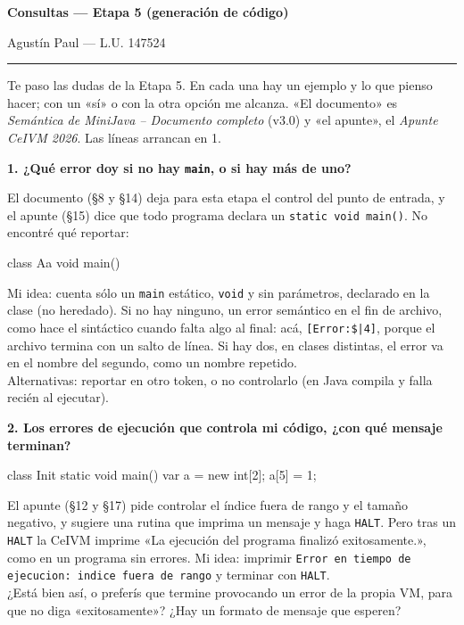 \documentclass[12pt,a4paper]{article}
\newcommand{\cod}[1]{\texttt{#1}}
\newcommand{\pregunta}[1]{\par\medskip\needspace{4\baselineskip}\noindent\textbf{#1}\par\smallskip}
\begin{document}
\thispagestyle{fancy}
\raggedright

{\LARGE\bfseries Consultas --- Etapa 5 (generación de código)\par}
\smallskip
{\color{tinta}Agustín Paul --- L.U. 147524\par}
\smallskip
{\color{tinta}\rule{\textwidth}{0.6pt}}
\medskip

Te paso las dudas de la Etapa 5. En cada una hay un ejemplo y lo que pienso hacer; con un «sí» o
con la otra opción me alcanza. «El documento» es \emph{Semántica de MiniJava -- Documento
completo} (v3.0) y «el apunte», el \emph{Apunte CeIVM 2026}. Las líneas arrancan en 1.

\pregunta{1. ¿Qué error doy si no hay \cod{main}, o si hay más de uno?}

El documento (§8 y §14) deja para esta etapa el control del punto de entrada, y el apunte (§15)
dice que todo programa declara un \cod{static void main()}. No encontré qué reportar:

\begin{fuente}
class Aa {
    void main() { }
}
\end{fuente}

Mi idea: cuenta sólo un \cod{main} estático, \cod{void} y sin parámetros, declarado en la clase (no
heredado). Si no hay ninguno, un error semántico en el fin de archivo, como hace el sintáctico
cuando falta algo al final: acá, \cod{[Error:\$|4]}, porque el archivo termina con un salto de
línea. Si hay dos, en clases distintas, el error va
en el nombre del segundo, como un nombre repetido.\\
Alternativas: reportar en otro token, o no controlarlo (en Java compila y falla recién al ejecutar).

\pregunta{2. Los errores de ejecución que controla mi código, ¿con qué mensaje terminan?}

\begin{fuente}
class Init {
    static void main() {
        var a = new int[2];
        a[5] = 1;
    }
}
\end{fuente}

El apunte (§12 y §17) pide controlar el índice fuera de rango y el tamaño negativo, y sugiere una
rutina que imprima un mensaje y haga \cod{HALT}. Pero tras un \cod{HALT} la CeIVM imprime «La
ejecución del programa finalizó exitosamente.», como en un programa sin errores. Mi idea: imprimir
\cod{Error en tiempo de ejecucion: indice fuera de rango} y terminar con \cod{HALT}.\\
¿Está bien así, o preferís que termine provocando un error de la propia VM, para que no diga
«exitosamente»? ¿Hay un formato de mensaje que esperen?
\end{document}
